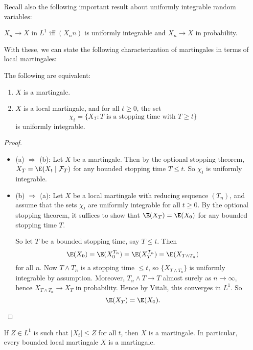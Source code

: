 \documentclass[a4paper]{article}
\begin{document}
Recall also the following important result about uniformly integrable random variables:
\begin{thm}
  $X_n \to X$ in $L^1$ iff $(X_nn)$ is uniformly integrable and $X_n \to X$ in probability.
\end{thm}

With these, we can state the following characterization of martingales in terms of local martingales:
\begin{prop}
  The following are equivalent:
  \begin{enumerate}
    \item $X$ is a martingale.
    \item $X$ is a local martingale, and for all $t \geq 0$, the set
      \[
        \chi_t = \{X_T: T\text{ is a stopping time with }T \geq t\}
      \]
      is uniformly integrable.
  \end{enumerate}
\end{prop}

\begin{proof}\leavevmode
  \begin{itemize}
    \item (a) $\Rightarrow$ (b): Let $X$ be a martingale. Then by the optional stopping theorem, $X_T = \E(X_t \mid \mathcal{F}_T)$ for any bounded stopping time $T \leq t$. So $\chi_t$ is uniformly integrable.
    \item (b) $\Rightarrow$ (a): Let $X$ be a local martingale with reducing sequence $(T_n)$, and assume that the sets $\chi_t$ are uniformly integrable for all $t \geq 0$. By the optional stopping theorem, it suffices to show that $\E(X_T) = \E(X_0)$ for any bounded stopping time $T$.

      So let $T$ be a bounded stopping time, say $T \leq t$. Then
      \[
        \E(X_0) = \E(X_0^{T_n}) = \E(X_T^{T_n}) = \E(X_{T \wedge T_n})
      \]
      for all $n$. Now $T \wedge T_n$ is a stopping time $\leq t$, so $\{X_{T \wedge T_n}\}$ is uniformly integrable by assumption. Moreover, $T_n \wedge T \to T$ almost surely as $n \to \infty$, hence $X_{T \wedge T_n} \to X_T$ in probability. Hence by Vitali, this converges in $L^1$. So
      \[
        \E(X_T) = \E(X_0).\qedhere
      \]%
  \end{itemize}
\end{proof}

\begin{cor}
  If $Z \in L^1$ is such that $|X_t| \leq Z$ for all $t$, then $X$ is a martingale. In particular, every bounded local martingale $X$ is a martingale.
\end{cor}
\end{document}
